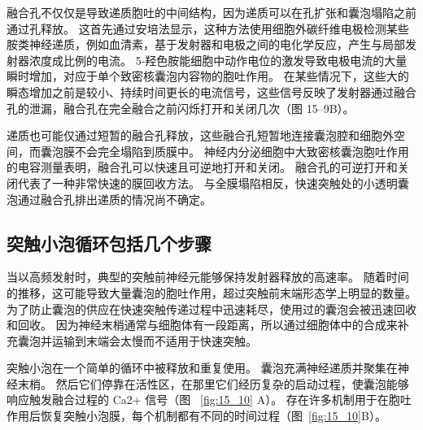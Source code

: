 融合孔不仅仅是导致递质胞吐的中间结构，因为递质可以在孔扩张和囊泡塌陷之前通过孔释放。
这首先通过安培法显示，这种方法使用细胞外碳纤维电极检测某些胺类神经递质，例如血清素，基于发射器和电极之间的电化学反应，产生与局部发射器浓度成比例的电流。
5-羟色胺能细胞中动作电位的激发导致电极电流的大量瞬时增加，对应于单个致密核囊泡内容物的胞吐作用。
在某些情况下，这些大的瞬态增加之前是较小、持续时间更长的电流信号，这些信号反映了发射器通过融合孔的泄漏，融合孔在完全融合之前闪烁打开和关闭几次（图 15–9B）。


递质也可能仅通过短暂的融合孔释放，这些融合孔短暂地连接囊泡腔和细胞外空间，而囊泡膜不会完全塌陷到质膜中。
神经内分泌细胞中大致密核囊泡胞吐作用的电容测量表明，融合孔可以快速且可逆地打开和关闭。
融合孔的可逆打开和关闭代表了一种非常快速的膜回收方法。
与全膜塌陷相反，快速突触处的小透明囊泡通过融合孔排出递质的情况尚不确定。



\subsection{突触小泡循环包括几个步骤}

当以高频发射时，典型的突触前神经元能够保持发射器释放的高速率。
随着时间的推移，这可能导致大量囊泡的胞吐作用，超过突触前末端形态学上明显的数量。
为了防止囊泡的供应在快速突触传递过程中迅速耗尽，使用过的囊泡会被迅速回收和回收。
因为神经末梢通常与细胞体有一段距离，所以通过细胞体中的合成来补充囊泡并运输到末端会太慢而不适用于快速突触。


突触小泡在一个简单的循环中被释放和重复使用。
囊泡充满神经递质并聚集在神经末梢。
然后它们停靠在活性区，在那里它们经历复杂的启动过程，使囊泡能够响应触发融合过程的 Ca2+ 信号（图 ~\ref{fig:15_10} A）。
存在许多机制用于在胞吐作用后恢复突触小泡膜，每个机制都有不同的时间过程（图~\ref{fig:15_10}B）。


